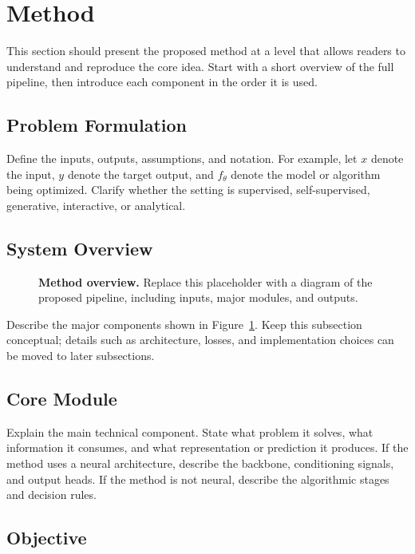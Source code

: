 \section{Method}

This section should present the proposed method at a level that allows readers to understand and reproduce the core idea.
Start with a short overview of the full pipeline, then introduce each component in the order it is used.

\subsection{Problem Formulation}

Define the inputs, outputs, assumptions, and notation.
For example, let $x$ denote the input, $y$ denote the target output, and $f_\theta$ denote the model or algorithm being optimized.
Clarify whether the setting is supervised, self-supervised, generative, interactive, or analytical.

\subsection{System Overview}

\begin{figure}[t]
    \centering
    \caption{\textbf{Method overview.} Replace this placeholder with a diagram of the proposed pipeline, including inputs, major modules, and outputs.}
    \label{fig:method_overview}
\end{figure}

Describe the major components shown in Figure~\ref{fig:method_overview}.
Keep this subsection conceptual; details such as architecture, losses, and implementation choices can be moved to later subsections.

\subsection{Core Module}

Explain the main technical component.
State what problem it solves, what information it consumes, and what representation or prediction it produces.
If the method uses a neural architecture, describe the backbone, conditioning signals, and output heads.
If the method is not neural, describe the algorithmic stages and decision rules.

\subsection{Objective}

